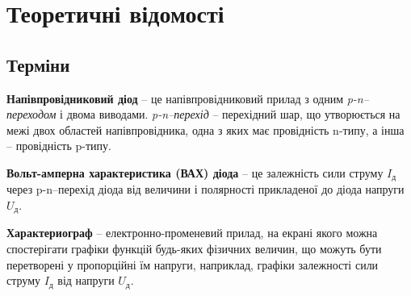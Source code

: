 \documentclass[
  ukrainian,
  14pt
]{extreport}
\begin{document}
\section{Теоретичні відомості}
\subsection{Терміни}
\textbf{Напівпровідниковий діод} – це напівпровідниковий
прилад з одним \textit{p-n–переходом} і двома виводами.
\textit{p-n–перехід }– перехідний шар, що утворюється на межі двох
областей напівпровідника, одна з яких має провідність n-типу, а інша –
провідність p-типу.

\textbf{Вольт-амперна характеристика (ВАХ) діода} – це залежність сили струму $I_{\text{д}}$ через p-n–перехід діода від
величини і полярності прикладеної до діода напруги $U_{\text{д}}$.

\textbf{Характериограф} – електронно-променевий прилад, на екрані якого можна
спостерігати графіки функцій будь-яких фізичних величин, що можуть бути
перетворені у пропорційні їм напруги, наприклад, графіки залежності сили
струму $I_{\text{д}}$ від напруги $U_{\text{д}}$.
\end{document}
